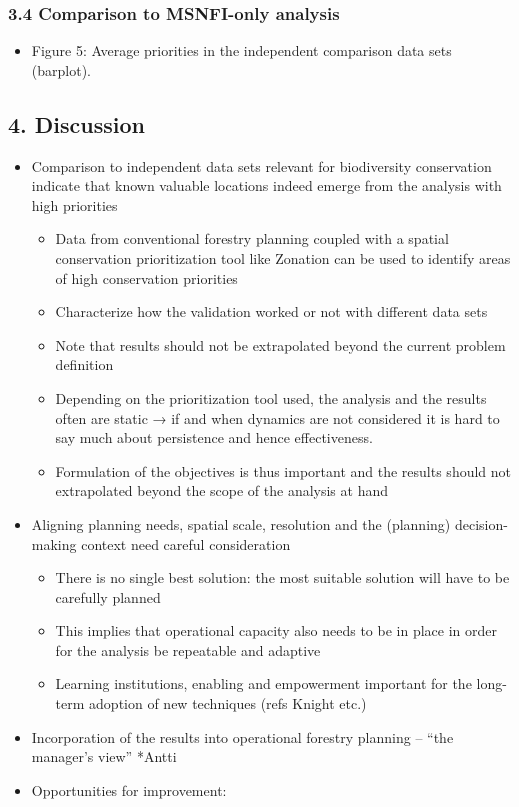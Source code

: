 \documentclass[]{article}
\begin{document}
\subsubsection{3.4 Comparison to MSNFI-only analysis}

\begin{itemize}
\itemsep1pt\parskip0pt
\item
  Figure 5: Average priorities in the independent comparison data sets
  (barplot).
\end{itemize}

\subsection{4. Discussion}

\begin{itemize}
\itemsep1pt\parskip0pt
\item
  Comparison to independent data sets relevant for biodiversity
  conservation indicate that known valuable locations indeed emerge from
  the analysis with high priorities

  \begin{itemize}
  \itemsep1pt\parskip0pt
  \item
    Data from conventional forestry planning coupled with a spatial
    conservation prioritization tool like Zonation can be used to
    identify areas of high conservation priorities
  \item
    Characterize how the validation worked or not with different data
    sets
  \item
    Note that results should not be extrapolated beyond the current
    problem definition
  \item
    Depending on the prioritization tool used, the analysis and the
    results often are static → if and when dynamics are not considered
    it is hard to say much about persistence and hence effectiveness.
  \item
    Formulation of the objectives is thus important and the results
    should not extrapolated beyond the scope of the analysis at hand
  \end{itemize}
\item
  Aligning planning needs, spatial scale, resolution and the (planning)
  decision-making context need careful consideration

  \begin{itemize}
  \itemsep1pt\parskip0pt
  \item
    There is no single best solution: the most suitable solution will
    have to be carefully planned
  \item
    This implies that operational capacity also needs to be in place in
    order for the analysis be repeatable and adaptive
  \item
    Learning institutions, enabling and empowerment important for the
    long-term adoption of new techniques (refs Knight etc.)
  \end{itemize}
\item
  Incorporation of the results into operational forestry planning --
  ``the manager's view'' *Antti
\item
  Opportunities for improvement:


\end{itemize}
\end{document}

